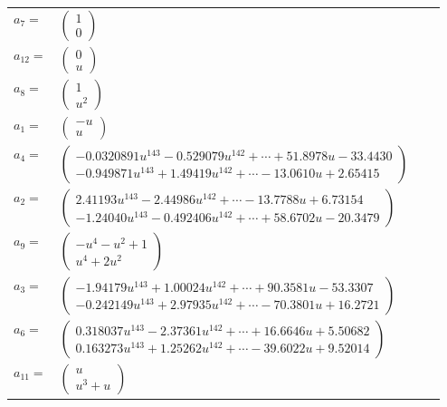 \documentclass[1p]{elsarticle_modified}
\theoremstyle{definition}
\begin{document}
\begin{tabular}{m{7pt} m{180pt} m{7pt} m{180pt} }
\flushright $a_{7}=$&$\begin{pmatrix}1\\0\end{pmatrix}$ \\
\flushright $a_{12}=$&$\begin{pmatrix}0\\u\end{pmatrix}$ \\
\flushright $a_{8}=$&$\begin{pmatrix}1\\u^2\end{pmatrix}$ \\
\flushright $a_{1}=$&$\begin{pmatrix}- u\\u\end{pmatrix}$ \\
\flushright $a_{4}=$&$\begin{pmatrix}-0.0320891 u^{143}-0.529079 u^{142}+\cdots+51.8978 u-33.4430\\-0.949871 u^{143}+1.49419 u^{142}+\cdots-13.0610 u+2.65415\end{pmatrix}$ \\
\flushright $a_{2}=$&$\begin{pmatrix}2.41193 u^{143}-2.44986 u^{142}+\cdots-13.7788 u+6.73154\\-1.24040 u^{143}-0.492406 u^{142}+\cdots+58.6702 u-20.3479\end{pmatrix}$ \\
\flushright $a_{9}=$&$\begin{pmatrix}- u^4- u^2+1\\u^4+2 u^2\end{pmatrix}$ \\
\flushright $a_{3}=$&$\begin{pmatrix}-1.94179 u^{143}+1.00024 u^{142}+\cdots+90.3581 u-53.3307\\-0.242149 u^{143}+2.97935 u^{142}+\cdots-70.3801 u+16.2721\end{pmatrix}$ \\
\flushright $a_{6}=$&$\begin{pmatrix}0.318037 u^{143}-2.37361 u^{142}+\cdots+16.6646 u+5.50682\\0.163273 u^{143}+1.25262 u^{142}+\cdots-39.6022 u+9.52014\end{pmatrix}$ \\
\flushright $a_{11}=$&$\begin{pmatrix}u\\u^3+u\end{pmatrix}$ \\

\end{tabular}
\end{document}
